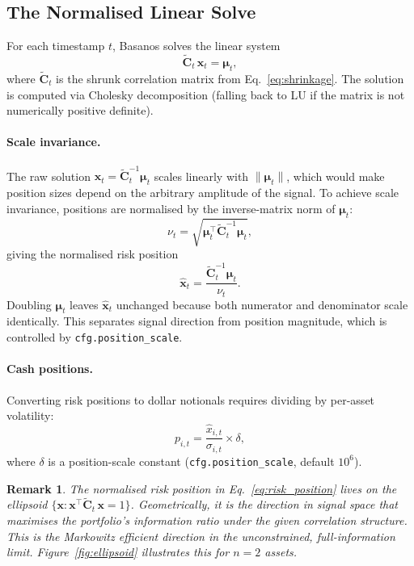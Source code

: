 \documentclass[11pt,a4paper]{article}
\newcommand{\C}{\mathbf{C}}
\newcommand{\x}{\mathbf{x}}
\newcommand{\muvec}{\bm{\mu}}
\newtheorem{remark}{Remark}
\begin{document}
\subsection{The Normalised Linear Solve}
\label{sec:solve}

For each timestamp $t$, Basanos solves the linear system
\begin{equation}
  \label{eq:system}
  \tilde{\C}_t\,\x_t = \muvec_t,
\end{equation}
where $\tilde{\C}_t$ is the shrunk correlation matrix from
Eq.~\eqref{eq:shrinkage}.  The solution is computed via Cholesky
decomposition (falling back to LU if the matrix is not numerically positive
definite).

\paragraph{Scale invariance.}
The raw solution $\x_t = \tilde{\C}_t^{-1}\muvec_t$ scales linearly with
$\|\muvec_t\|$, which would make position sizes depend on the arbitrary
amplitude of the signal.  To achieve scale invariance, positions are
normalised by the inverse-matrix norm of $\muvec_t$:
\begin{equation}
  \label{eq:norm}
  \nu_t = \sqrt{\muvec_t^\top \tilde{\C}_t^{-1} \muvec_t},
\end{equation}
giving the normalised risk position
\begin{equation}
  \label{eq:risk_position}
  \hat{\x}_t = \frac{\tilde{\C}_t^{-1}\muvec_t}{\nu_t}.
\end{equation}
Doubling $\muvec_t$ leaves $\hat{\x}_t$ unchanged because both numerator
and denominator scale identically.  This separates signal direction from
position magnitude, which is controlled by \texttt{cfg.position\_scale}.

\paragraph{Cash positions.}
Converting risk positions to dollar notionals requires dividing by per-asset
volatility:
\begin{equation}
  \label{eq:cash_position}
  p_{i,t} = \frac{\hat{x}_{i,t}}{\sigma_{i,t}} \times \delta,
\end{equation}
where $\delta$ is a position-scale constant (\texttt{cfg.position\_scale},
default $10^6$).

\begin{remark}
  The normalised risk position in Eq.~\eqref{eq:risk_position} lives on the
  ellipsoid $\{\x : \x^\top\tilde{\C}_t\,\x = 1\}$.  Geometrically, it is
  the direction in signal space that maximises the portfolio's
  information ratio under the given correlation structure.  This is the
  Markowitz efficient direction in the unconstrained, full-information limit.
  Figure~\ref{fig:ellipsoid} illustrates this for $n = 2$ assets.
\end{remark}
\end{document}
